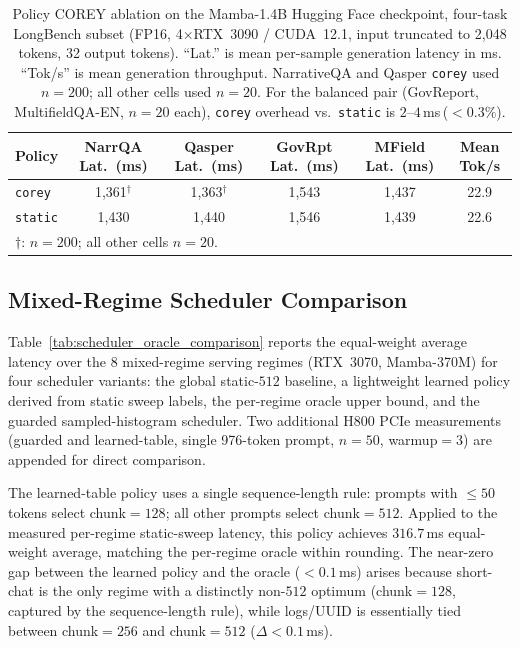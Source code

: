 \begin{table}[!t]
\centering
\caption{Policy COREY ablation on the Mamba-1.4B Hugging Face checkpoint,
four-task LongBench subset (FP16, 4$\times$RTX~3090 / CUDA~12.1,
input truncated to 2{,}048 tokens, 32 output tokens).
``Lat.'' is mean per-sample generation latency in ms.
``Tok/s'' is mean generation throughput.
NarrativeQA and Qasper \texttt{corey} used $n{=}200$; all other cells used $n{=}20$.
For the balanced pair (GovReport, MultifieldQA-EN, $n{=}20$ each),
\texttt{corey} overhead vs.\ \texttt{static} is $2$--$4$\,ms\,($<0.3\%$).}
\label{tab:policy_corey_mamba2}
\small
\begin{tabular}{lccccc}
\toprule
Policy & NarrQA Lat.\ (ms) & Qasper Lat.\ (ms) & GovRpt Lat.\ (ms) & MField Lat.\ (ms) & Mean Tok/s \\
\midrule
\texttt{corey}  & 1{,}361$^{\dagger}$ & 1{,}363$^{\dagger}$ & 1{,}543 & 1{,}437 & 22.9 \\
\texttt{static} & 1{,}430 & 1{,}440 & 1{,}546 & 1{,}439 & 22.6 \\
\bottomrule
\multicolumn{6}{l}{\small $\dagger$: $n{=}200$; all other cells $n{=}20$.} \\
\end{tabular}
\end{table}

\subsection{Mixed-Regime Scheduler Comparison}
\label{sec:scheduler_oracle_comparison}

Table~\ref{tab:scheduler_oracle_comparison} reports the equal-weight average latency over the $8$ mixed-regime serving regimes (RTX~3070, Mamba-370M) for four scheduler variants: the global static-$512$ baseline, a lightweight learned policy derived from static sweep labels, the per-regime oracle upper bound, and the guarded sampled-histogram scheduler. Two additional H800 PCIe measurements (guarded and learned-table, single 976-token prompt, $n{=}50$, warmup$=3$) are appended for direct comparison.

The learned-table policy uses a single sequence-length rule: prompts with $\leq50$ tokens select chunk$=128$; all other prompts select chunk$=512$.
Applied to the measured per-regime static-sweep latency, this policy achieves $316.7$\,ms equal-weight average, matching the per-regime oracle within rounding.
The near-zero gap between the learned policy and the oracle ($<0.1$\,ms) arises because short-chat is the only regime with a distinctly non-$512$ optimum (chunk$=128$, captured by the sequence-length rule), while logs/UUID is essentially tied between chunk$=256$ and chunk$=512$ ($\Delta{<}0.1$\,ms).


